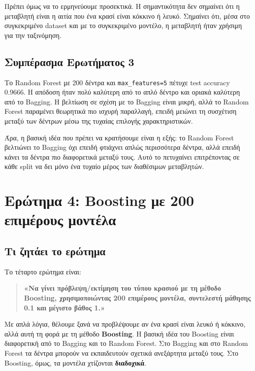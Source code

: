 \documentclass[12pt,a4paper]{article}
\newcommand{\code}[1]{\texttt{\textenglish{#1}}}
\begin{document}
Πρέπει όμως να το ερμηνεύουμε προσεκτικά. Η σημαντικότητα δεν σημαίνει ότι η
μεταβλητή είναι η αιτία που ένα κρασί είναι κόκκινο ή λευκό. Σημαίνει ότι,
μέσα στο συγκεκριμένο dataset και με το συγκεκριμένο μοντέλο, η μεταβλητή ήταν
χρήσιμη για την ταξινόμηση.

\subsection{Συμπέρασμα Ερωτήματος 3}

Το Random Forest με 200 δέντρα και \code{max\_features=5} πέτυχε test accuracy
0.9666. Η απόδοση ήταν πολύ καλύτερη από το απλό δέντρο και οριακά καλύτερη
από το Bagging. Η βελτίωση σε σχέση με το Bagging είναι μικρή, αλλά το Random
Forest παραμένει θεωρητικά πιο ισχυρή παραλλαγή, επειδή μειώνει τη συσχέτιση
μεταξύ των δέντρων μέσω της τυχαίας επιλογής χαρακτηριστικών.

Άρα, η βασική ιδέα που πρέπει να κρατήσουμε είναι η εξής: το Random Forest
βελτιώνει το Bagging όχι επειδή φτιάχνει απλώς περισσότερα δέντρα, αλλά επειδή
κάνει τα δέντρα πιο διαφορετικά μεταξύ τους. Αυτό το πετυχαίνει επιτρέποντας
σε κάθε split να δει μόνο ένα τυχαίο μέρος των διαθέσιμων μεταβλητών.

\section{Ερώτημα 4: Boosting με 200 επιμέρους μοντέλα}

\subsection{Τι ζητάει το ερώτημα}

Το τέταρτο ερώτημα είναι:

\begin{quote}
\textbf{«Να γίνει πρόβλεψη/εκτίμηση του τύπου κρασιού με τη μέθοδο Boosting,
χρησιμοποιώντας 200 επιμέρους μοντέλα, συντελεστή μάθησης 0.1 και μέγιστο
βάθος 1.»}
\end{quote}

Με απλά λόγια, θέλουμε ξανά να προβλέψουμε αν ένα κρασί είναι λευκό ή κόκκινο,
αλλά αυτή τη φορά με τη μέθοδο \textbf{Boosting}. Η βασική ιδέα του Boosting
είναι διαφορετική από το Bagging και το Random Forest. Στο Bagging και στο
Random Forest τα δέντρα μπορούν να εκπαιδευτούν σχετικά ανεξάρτητα μεταξύ
τους. Στο Boosting, όμως, τα μοντέλα χτίζονται \textbf{διαδοχικά}.
\end{document}
